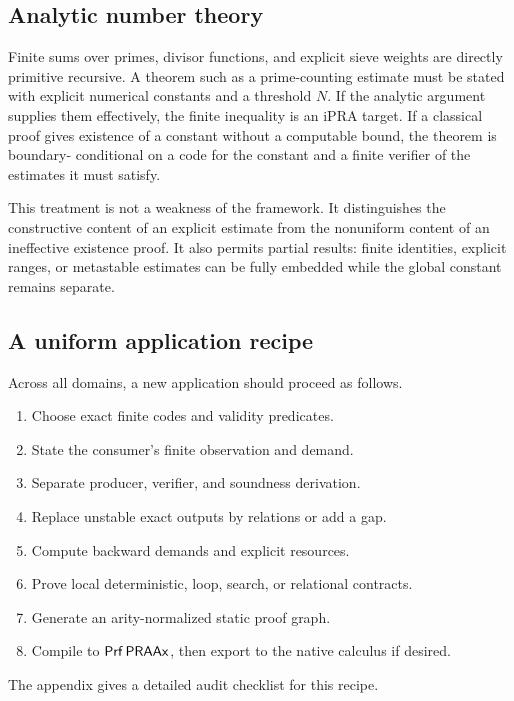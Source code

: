 \subsection{Analytic number theory}

Finite sums over primes, divisor functions, and explicit sieve weights are directly primitive recursive.
A theorem such as a prime-counting estimate must be stated with explicit numerical constants and a threshold
\(N\).  If the analytic argument supplies them effectively, the finite inequality is an iPRA target.  If a
classical proof gives existence of a constant without a computable bound, the theorem is boundary-
conditional on a code for the constant and a finite verifier of the estimates it must satisfy.

This treatment is not a weakness of the framework.  It distinguishes the constructive content of an
explicit estimate from the nonuniform content of an ineffective existence proof.  It also permits partial
results: finite identities, explicit ranges, or metastable estimates can be fully embedded while the global
constant remains separate.

\subsection{A uniform application recipe}

Across all domains, a new application should proceed as follows.
\begin{enumerate}
  \item Choose exact finite codes and validity predicates.
  \item State the consumer's finite observation and demand.
  \item Separate producer, verifier, and soundness derivation.
  \item Replace unstable exact outputs by relations or add a gap.
  \item Compute backward demands and explicit resources.
  \item Prove local deterministic, loop, search, or relational contracts.
  \item Generate an arity-normalized static proof graph.
  \item Compile to \(\mathsf{Prf}\,\mathsf{PRAAx}\), then export to the native calculus if desired.
\end{enumerate}
The appendix gives a detailed audit checklist for this recipe.

